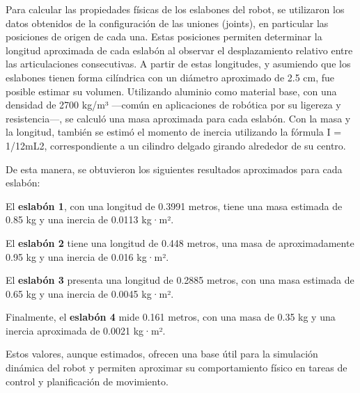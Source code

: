Para calcular las propiedades físicas de los eslabones del robot, se utilizaron los datos obtenidos de la configuración de las uniones (joints), en particular las posiciones de origen de cada una. Estas posiciones permiten determinar la longitud aproximada de cada eslabón al observar el desplazamiento relativo entre las articulaciones consecutivas. A partir de estas longitudes, y asumiendo que los eslabones tienen forma cilíndrica con un diámetro aproximado de 2.5 cm, fue posible estimar su volumen. Utilizando aluminio como material base, con una densidad de 2700 kg/m³ —común en aplicaciones de robótica por su ligereza y resistencia—, se calculó una masa aproximada para cada eslabón. Con la masa y la longitud, también se estimó el momento de inercia utilizando la fórmula I = 1/12mL2, correspondiente a un cilindro delgado girando alrededor de su centro.

De esta manera, se obtuvieron los siguientes resultados aproximados para cada eslabón:

El \textbf{eslabón 1}, con una longitud de 0.3991 metros, tiene una masa estimada de 0.85 kg y una inercia de 0.0113 kg·m².

El \textbf{eslabón 2} tiene una longitud de 0.448 metros, una masa de aproximadamente 0.95 kg y una inercia de 0.016 kg·m².

El \textbf{eslabón 3} presenta una longitud de 0.2885 metros, con una masa estimada de 0.65 kg y una inercia de 0.0045 kg·m².

Finalmente, el \textbf{eslabón 4} mide 0.161 metros, con una masa de 0.35 kg y una inercia aproximada de 0.0021 kg·m².

Estos valores, aunque estimados, ofrecen una base útil para la simulación dinámica del robot y permiten aproximar su comportamiento físico en tareas de control y planificación de movimiento.

